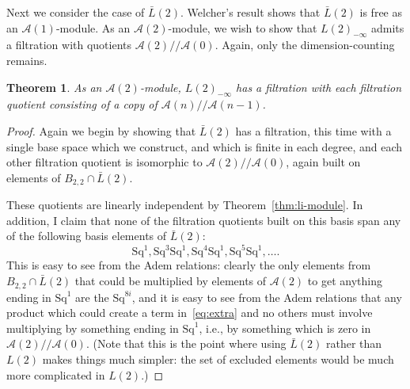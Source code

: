 \documentclass{article}
\newcommand{\A}{\mathcal{A}}
\newcommand{\Sq}{\mathrm{Sq}}
\newcommand{\mmod}{/\!/\!}
\renewcommand{\L}{\bar{L}}
\newcommand{\Lkm}[1][k]{L{(#1)}_{-\infty}}
\newtheorem{thm}{Theorem}
\begin{document}
Next we consider the case of $\L(2)$.  Welcher's result shows that $\L(2)$ is free as an $\A(1)$-module.  As an $\A(2)$-module, we wish to show that $\Lkm[2]$ admits a filtration with quotients $\A(2)\mmod\A(0)$.  Again, only the dimension-counting remains.

\begin{thm}
  As an $\A(2)$-module, $\Lkm[2]$ has a filtration with each filtration quotient consisting of a copy of $\A(n)\mmod\A(n-1)$.
\end{thm}
\begin{proof}
  Again we begin by showing that $\L(2)$ has a filtration, this time with a single base space which we construct, and which is finite in each degree, and each other filtration quotient is isomorphic to $\A(2)\mmod\A(0)$, again built on elements of $B_{2,2}\cap \L(2)$.

  These quotients are linearly independent by Theorem~\ref{thm:li-module}.  In addition, I claim that none of the filtration quotients built on this basis span any of the following basis elements of $\L(2)$:
\begin{equation} \Sq^1, \Sq^3\Sq^1, \Sq^4\Sq^1, \Sq^5\Sq^1, \ldots. \label{eq:extra}\end{equation}
  This is easy to see from the Adem relations: clearly the only elements from $B_{2,2}\cap \L(2)$ that could be multiplied by elements of $\A(2)$ to get anything ending in $\Sq^1$ are the $\Sq^{8i}$, and it is easy to see from the Adem relations that any product which could create a term in~\eqref{eq:extra} and no others must involve multiplying by something ending in $\Sq^1$, i.e., by something which is zero in $\A(2)\mmod\A(0)$.  (Note that this is the point where using $\L(2)$ rather than $L(2)$ makes things much simpler: the set of excluded elements would be much more complicated in $L(2)$.)


\end{proof}
\end{document}
